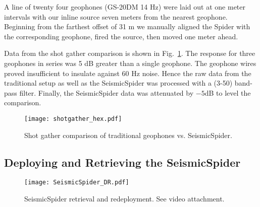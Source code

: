 A line of twenty four geophones (GS-20DM 14 Hz) were laid out at one meter intervals with our inline source seven meters from the nearest geophone. Beginning from the farthest offset of 31 m we manually aligned the Spider with the corresponding geophone, fired the source, then moved one meter ahead. 

Data from the shot gather comparison is shown in Fig.~\ref{fig:shotgatherHexpod}.
The response for three geophones in series was 5 dB greater than a single geophone. The geophone wires proved insufficient to insulate against 60 Hz noise. Hence the raw data from the traditional setup as well as the SeismicSpider was processed with a (3-50) band-pass filter. Finally, the SeismicSpider data was attenuated by $-5$dB to level the comparison.    

\begin{figure} \centering
  \texttt{[image: shotgather\_hex.pdf]}
 \caption{Shot gather comparison of traditional geophones vs. SeismicSpider. 
 \label{fig:shotgatherHexpod}}
\end{figure}



\subsection{Deploying and Retrieving the SeismicSpider}

\begin{figure} \centering
  \texttt{[image: SeismicSpider\_DR.pdf]}
 \caption{SeismicSpider retrieval and redeployment. See video attachment. 
 \label{fig:SeismicSpiderDR}}
\end{figure}

